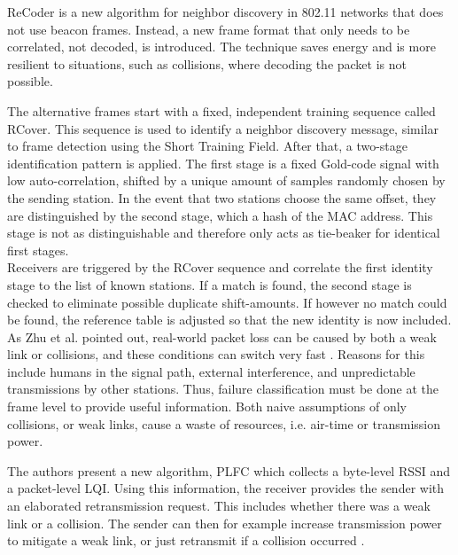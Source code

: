 ReCoder \cite{meng2015} is a new algorithm for neighbor discovery in 802.11 networks that does not use beacon frames. Instead, a new frame format that only needs to be correlated, not decoded, is introduced. The technique saves energy and is more resilient to situations, such as collisions, where decoding the packet is not possible.

The alternative frames start with a fixed, independent training sequence called RCover. This sequence is used to identify a neighbor discovery message, similar to frame detection using the Short Training Field. After that, a two-stage identification pattern is applied. The first stage is a fixed Gold-code signal with low auto-correlation, shifted by a unique amount of samples randomly chosen by the sending station. In the event that two stations choose the same offset, they are distinguished by the second stage, which a hash of the MAC address. This stage is not as distinguishable and therefore only acts as tie-beaker for identical first stages.\\

Receivers are triggered by the RCover sequence and correlate the first identity stage to the list of known stations. If a match is found, the second stage is checked to eliminate possible duplicate shift-amounts. If however no match could be found, the reference table is adjusted so that the new identity is now included.\\

As Zhu et al. pointed out, real-world packet loss can be caused by both a weak link or collisions, and these conditions can switch very fast \cite{zhu2016}. Reasons for this include humans in the signal path, external interference, and unpredictable transmissions by other stations. Thus, failure classification must be done at the frame level to provide useful information. Both naive assumptions of only collisions, or weak links, cause a waste of resources, i.e. air-time or transmission power.

The authors present a new algorithm, \gls{PLFC} which collects a byte-level \gls{RSSI} and a packet-level \gls{LQI}. Using this information, the receiver provides the sender with an elaborated retransmission request. This includes whether there was a weak link or a collision. The sender can then for example increase transmission power to mitigate a weak link, or just retransmit if a collision occurred \cite{zhu2016}.\\

